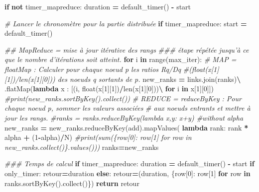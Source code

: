 \documentclass[10pt,a4paper]{article}
\newenvironment{Shaded}{\begin{snugshade}}{\end{snugshade}}
\newcommand{\BuiltInTok}[1]{#1}
\newcommand{\CommentTok}[1]{\textcolor[rgb]{0.56,0.35,0.01}{\textit{#1}}}
\newcommand{\ControlFlowTok}[1]{\textcolor[rgb]{0.13,0.29,0.53}{\textbf{#1}}}
\newcommand{\DecValTok}[1]{\textcolor[rgb]{0.00,0.00,0.81}{#1}}
\newcommand{\KeywordTok}[1]{\textcolor[rgb]{0.13,0.29,0.53}{\textbf{#1}}}
\newcommand{\NormalTok}[1]{#1}
\newcommand{\OperatorTok}[1]{\textcolor[rgb]{0.81,0.36,0.00}{\textbf{#1}}}
\theoremstyle{break}
\begin{document}
\begin{Shaded}
\begin{Highlighting}[]
    \ControlFlowTok{if} \KeywordTok{not}\NormalTok{ timer_mapreduce:}
\NormalTok{            duration }\OperatorTok{=}\NormalTok{ default_timer() }\OperatorTok{-}\NormalTok{ start}
    
    \CommentTok{# Lancer le chronomètre pour la partie distribuée}
    \ControlFlowTok{if}\NormalTok{ timer_mapreduce:}
\NormalTok{            start }\OperatorTok{=}\NormalTok{ default_timer()}
            
    \CommentTok{## MapReduce = mise à jour itérative des rangs}
    \CommentTok{### étape répétée jusqu'à ce que le nombre d'itérations soit atteint. }
    \ControlFlowTok{for}\NormalTok{ i }\KeywordTok{in} \BuiltInTok{range}\NormalTok{(max_iter):}
    \CommentTok{# MAP = floatMap : Calculer pour chaque noeud p les ratios Rq/Dq }
    \CommentTok{#(float(x[1][1])/len(x[1][0])) des noeuds q sortants de p.}
\NormalTok{        new_ranks }\OperatorTok{=}\NormalTok{ links.join(ranks)}\OperatorTok{\textbackslash{}}
\NormalTok{                    .flatMap(}\KeywordTok{lambda}\NormalTok{ x : [(i, }\BuiltInTok{float}\NormalTok{(x[}\DecValTok{1}\NormalTok{][}\DecValTok{1}\NormalTok{])}\OperatorTok{/}\BuiltInTok{len}\NormalTok{(x[}\DecValTok{1}\NormalTok{][}\DecValTok{0}\NormalTok{]))}\OperatorTok{\textbackslash{}}
                                         \ControlFlowTok{for}\NormalTok{ i }\KeywordTok{in}\NormalTok{ x[}\DecValTok{1}\NormalTok{][}\DecValTok{0}\NormalTok{]])  }
        \CommentTok{#print(new_ranks.sortByKey().collect())}
        \CommentTok{# REDUCE = reduceByKey : Pour chaque noeud p, sommer les valeurs associées }
        \CommentTok{# aux noeuds entrants et mettre à jour les rangs.}
        \CommentTok{#ranks = ranks.reduceByKey(lambda x,y: x+y) #without alpha}
\NormalTok{        new_ranks }\OperatorTok{=}\NormalTok{ new_ranks.reduceByKey(add).mapValues(}
            \KeywordTok{lambda}\NormalTok{ rank: rank }\OperatorTok{*}\NormalTok{ alpha }\OperatorTok{+}\NormalTok{ (}\DecValTok{1}\OperatorTok{-}\NormalTok{alpha)}\OperatorTok{/}\NormalTok{N)  }
        \CommentTok{#print(sum(\{row[0]: row[1]  for row in new_ranks.collect()\}.values()))}
\NormalTok{        ranks}\OperatorTok{=}\NormalTok{new_ranks}
        
    \CommentTok{### Temps de calcul}
    \ControlFlowTok{if}\NormalTok{ timer_mapreduce:}
\NormalTok{            duration }\OperatorTok{=}\NormalTok{ default_timer() }\OperatorTok{-}\NormalTok{ start}
    \ControlFlowTok{if}\NormalTok{ only_timer:}
\NormalTok{        retour}\OperatorTok{=}\NormalTok{duration}
    \ControlFlowTok{else}\NormalTok{:}
\NormalTok{        retour}\OperatorTok{=}\NormalTok{(duration, \{row[}\DecValTok{0}\NormalTok{]: row[}\DecValTok{1}\NormalTok{]  }\ControlFlowTok{for}\NormalTok{ row }\KeywordTok{in}\NormalTok{ ranks.sortByKey().collect()\}) }
    \ControlFlowTok{return}\NormalTok{ retour}
\end{Highlighting}
\end{Shaded}
\end{document}
